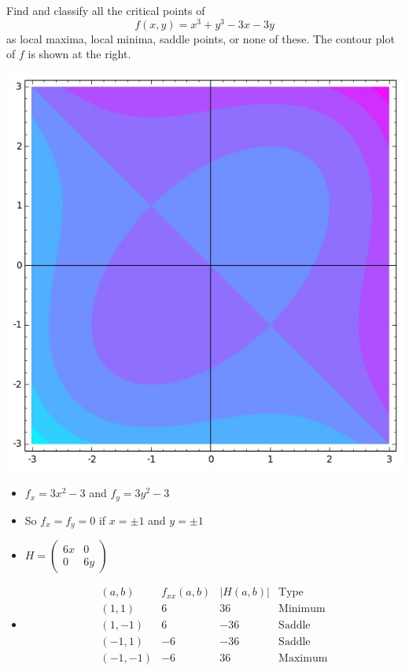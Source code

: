 \documentclass[answers,12pt,addpoints]{exam}
\begin{document}
\begin{questions}
\ifprintanswers\else\begin{multicols}{2}\fi
\question[25] Find and classify all
the critical points of \[f\left(x,y\right)
=x^3+y^3-3x-3y\] as local maxima, local minima,
saddle points, or none of these.
\ifprintanswers\else
The contour plot of $f$ is shown at the right.
\begin{center}\includegraphics[scale=.4]{Saddles}\end{center}
\end{multicols}\fi
\begin{solution}
\begin{itemize}
\item $f_x=3x^2-3$ and $f_y=3y^2-3$
\item So $f_x=f_y=0$ if $x=\pm 1$ and $y=\pm 1$
\item $H=\begin{pmatrix}6x&0\\0&6y\end{pmatrix}$
\item
\[\begin{array}{c|c|c|c}
\left(a,b\right)&f_{xx}\left(a,b\right)
&\left|H\left(a,b\right)\right|&\text{Type}\\\hline
\left(1,1\right)&6&36&\text{Minimum}\\
\left(1,-1\right)&6&-36&\text{Saddle}\\
\left(-1,1\right)&-6&-36&\text{Saddle}\\
\left(-1,-1\right)&-6&36&\text{Maximum}
\end{array}\]
\end{itemize}
\end{solution}


\end{questions}
\end{document}
